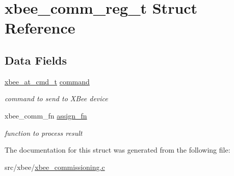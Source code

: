 \hypertarget{structxbee__comm__reg__t}{\section{xbee\-\_\-comm\-\_\-reg\-\_\-t Struct Reference}
\label{structxbee__comm__reg__t}
}
\subsection*{Data Fields}
\begin{DoxyCompactItemize}
\item 
\hypertarget{group__xbee__commissioning_gaa1e66c60bb56acaced6ca2646fd44616}{\hyperlink{unionxbee__at__cmd__t}{xbee\-\_\-at\-\_\-cmd\-\_\-t} \hyperlink{group__xbee__commissioning_gaa1e66c60bb56acaced6ca2646fd44616}{command}}\label{group__xbee__commissioning_gaa1e66c60bb56acaced6ca2646fd44616}

\begin{DoxyCompactList}\small\item\em command to send to X\-Bee device \end{DoxyCompactList}\item 
\hypertarget{group__xbee__commissioning_ga7cde42d4d91d04d62d5810e84cde3228}{xbee\-\_\-comm\-\_\-fn \hyperlink{group__xbee__commissioning_ga7cde42d4d91d04d62d5810e84cde3228}{assign\-\_\-fn}}\label{group__xbee__commissioning_ga7cde42d4d91d04d62d5810e84cde3228}

\begin{DoxyCompactList}\small\item\em function to process result \end{DoxyCompactList}\end{DoxyCompactItemize}


The documentation for this struct was generated from the following file\-:\begin{DoxyCompactItemize}
\item 
src/xbee/\hyperlink{xbee__commissioning_8c}{xbee\-\_\-commissioning.\-c}\end{DoxyCompactItemize}
